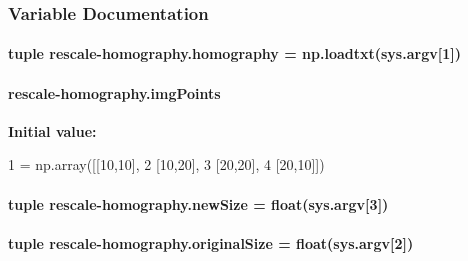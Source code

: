 \subsubsection{Variable Documentation}
\hypertarget{namespacerescale-homography_a42ffc42ab732245a1523d5a509bb8b1a}{
\paragraph[{homography}]{\setlength{\rightskip}{0pt plus 5cm}tuple rescale-\/homography.\-homography = np.\-loadtxt(sys.\-argv\mbox{[}1\mbox{]})}}\label{namespacerescale-homography_a42ffc42ab732245a1523d5a509bb8b1a}
\hypertarget{namespacerescale-homography_a75e8d0f1b7d28d78d256c46c4bf6ce55}{
\paragraph[{img\-Points}]{\setlength{\rightskip}{0pt plus 5cm}rescale-\/homography.\-img\-Points}}\label{namespacerescale-homography_a75e8d0f1b7d28d78d256c46c4bf6ce55}
{\bfseries Initial value\-:}
\begin{DoxyCode}
1 = np.array([[10,10],
2                       [10,20],
3                       [20,20],
4                       [20,10]])
\end{DoxyCode}
\hypertarget{namespacerescale-homography_a67c44d251f65d66939ff6006bfaa3d51}{
\paragraph[{new\-Size}]{\setlength{\rightskip}{0pt plus 5cm}tuple rescale-\/homography.\-new\-Size = float(sys.\-argv\mbox{[}3\mbox{]})}}\label{namespacerescale-homography_a67c44d251f65d66939ff6006bfaa3d51}
\hypertarget{namespacerescale-homography_a0e5471c7a35e44f5da24c0384591940b}{
\paragraph[{original\-Size}]{\setlength{\rightskip}{0pt plus 5cm}tuple rescale-\/homography.\-original\-Size = float(sys.\-argv\mbox{[}2\mbox{]})}}\label{namespacerescale-homography_a0e5471c7a35e44f5da24c0384591940b}

